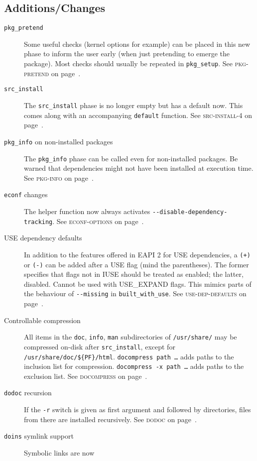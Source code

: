 \documentclass[a4paper]{leaflet}
\newcommand{\code}[1]{\texttt{#1}}
\newcommand{\featureref}[1]{\textsc{#1} on page~\pageref{feat:#1}}
\begin{document}
\subsection{Additions/Changes}
\label{sec:cs:eapi4-additions}
\begin{description}
    \item[\code{pkg\_pretend}] Some useful checks (kernel options for
    example) can be placed in this new phase to inform the user early
    (when just pretending to emerge the package).  Most checks should
    usually be repeated in \code{pkg\_setup}.
    See \featureref{pkg-pretend}.
    \item[\code{src\_install}] The \code{src\_install} phase is no
    longer empty but has a default now.  This comes along with an
    accompanying \code{default} function.
    See \featureref{src-install-4}.
    \item[\code{pkg\_info} on non-installed packages] The
    \code{pkg\_info} phase can be called even for non-installed
    packages.  Be warned that dependencies might not have been
    installed at execution time.  See \featureref{pkg-info}.
    \item[\code{econf} changes] The helper function now always
    activates \code{-{}-disable-dependency-tracking}.
    See \featureref{econf-options}.
    \item[USE dependency defaults] In addition to the features offered
    in EAPI 2 for USE dependencies, a \code{(+)} or \code{(-)} can be
    added after a USE flag (mind the parentheses).  The former
    specifies that flags not in IUSE should be treated as enabled; the
    latter, disabled. Cannot be used with USE\_EXPAND flags.  This
    mimics parts of the behaviour of \code{-{}-missing} in
    \code{built\_with\_use}.  See \featureref{use-dep-defaults}.
    \item[Controllable compression] All items in the \code{doc},
    \code{info}, \code{man} subdirectories of \code{/usr/share/} may
    be compressed on-disk after \code{src\_install}, except for
    \code{/usr/share/doc/\$\{PF\}/html}.  \code{docompress path \dots}
    adds paths to the inclusion list for compression.
    \code{docompress -x path \dots} adds paths to the exclusion list.
    See \featureref{docompress}.
    \item[\code{dodoc} recursion] If the \code{-r} switch is given as
    first argument and followed by directories, files from there are
    installed recursively.  See \featureref{dodoc}.
    \item[\code{doins} symlink support] Symbolic links are now

\end{description}
\end{document}
